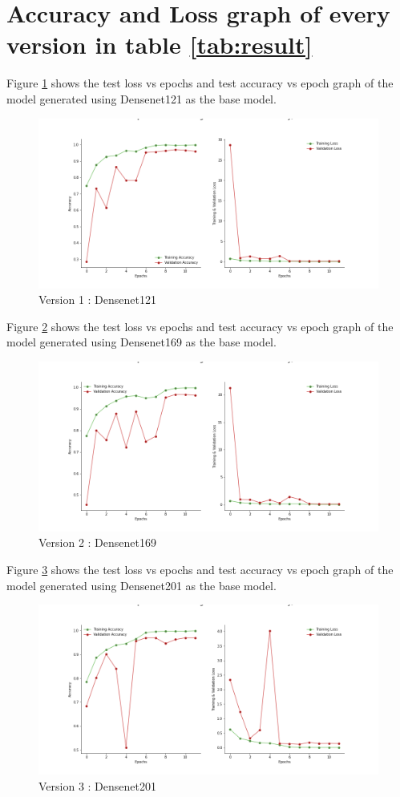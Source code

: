 \section{Accuracy and Loss graph of every version in table \ref{tab:result}}
Figure \ref{fig:dense121} shows the test loss vs epochs and test accuracy vs epoch graph of the model generated using Densenet121 as the base model.
\begin{figure}[H]
\includegraphics[scale=0.44]{Photos/densenet121_plot.png}
\caption{Version 1 : Densenet121} \label{fig:dense121}
\end{figure}
Figure \ref{fig:dense169} shows the test loss vs epochs and test accuracy vs epoch graph of the model generated using Densenet169 as the base model.
\begin{figure}[H]
\includegraphics[scale=0.3]{Photos/densenet169_plot.png}
\caption{Version 2 : Densenet169} \label{fig:dense169}
\end{figure}
Figure \ref{fig:dense201} shows the test loss vs epochs and test accuracy vs epoch graph of the model generated using Densenet201 as the base model.
\begin{figure}[H]
\includegraphics[scale=0.29]{Photos/densenet201_plot.png}
\caption{Version 3 : Densenet201} \label{fig:dense201}
\end{figure}
